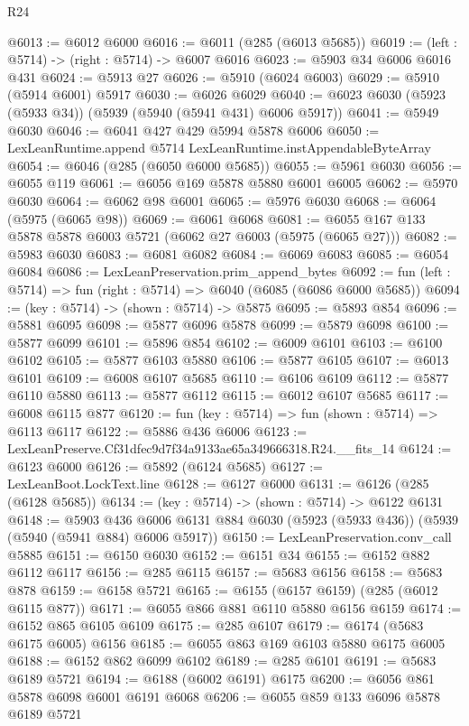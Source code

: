 \begin{lexlean}{R24}
\begin{coremodule}
@6013 := @6012 @6000
@6016 := @6011 (@285 (@6013 @5685))
@6019 := (left : @5714) -> (right : @5714) -> @6007 @6016
@6023 := @5903 @34 @6006 @6016 @431
@6024 := @5913 @27
@6026 := @5910 (@6024 @6003)
@6029 := @5910 (@5914 @6001) @5917
@6030 := @6026 @6029
@6040 := @6023 @6030 (@5923 (@5933 @34)) (@5939 (@5940 (@5941 @431) @6006 @5917))
@6041 := @5949 @6030
@6046 := @6041 @427 @429 @5994 @5878 @6006
@6050 := LexLeanRuntime.append @5714 LexLeanRuntime.instAppendableByteArray
@6054 := @6046 (@285 (@6050 @6000 @5685))
@6055 := @5961 @6030
@6056 := @6055 @119
@6061 := @6056 @169 @5878 @5880 @6001 @6005
@6062 := @5970 @6030
@6064 := @6062 @98 @6001
@6065 := @5976 @6030
@6068 := @6064 (@5975 (@6065 @98))
@6069 := @6061 @6068
@6081 := @6055 @167 @133 @5878 @5878 @6003 @5721 (@6062 @27 @6003 (@5975 (@6065 @27)))
@6082 := @5983 @6030
@6083 := @6081 @6082
@6084 := @6069 @6083
@6085 := @6054 @6084
@6086 := LexLeanPreservation.prim_append_bytes
@6092 := fun (left : @5714) => fun (right : @5714) => @6040 (@6085 (@6086 @6000 @5685))
@6094 := (key : @5714) -> (shown : @5714) -> @5875
@6095 := @5893 @854
@6096 := @5881 @6095
@6098 := @5877 @6096 @5878
@6099 := @5879 @6098
@6100 := @5877 @6099
@6101 := @5896 @854
@6102 := @6009 @6101
@6103 := @6100 @6102
@6105 := @5877 @6103 @5880
@6106 := @5877 @6105
@6107 := @6013 @6101
@6109 := @6008 @6107 @5685
@6110 := @6106 @6109
@6112 := @5877 @6110 @5880
@6113 := @5877 @6112
@6115 := @6012 @6107 @5685
@6117 := @6008 @6115 @877
@6120 := fun (key : @5714) => fun (shown : @5714) => @6113 @6117
@6122 := @5886 @436 @6006
@6123 := LexLeanPreserve.Cf31dfec9d7f34a9133ae65a349666318.R24.__fits_14
@6124 := @6123 @6000
@6126 := @5892 (@6124 @5685)
@6127 := LexLeanBoot.LockText.line
@6128 := @6127 @6000
@6131 := @6126 (@285 (@6128 @5685))
@6134 := (key : @5714) -> (shown : @5714) -> @6122 @6131
@6148 := @5903
    @436
    @6006
    @6131
    @884
    @6030
    (@5923 (@5933 @436))
    (@5939 (@5940 (@5941 @884) @6006 @5917))
@6150 := LexLeanPreservation.conv_call @5885
@6151 := @6150 @6030
@6152 := @6151 @34
@6155 := @6152 @882 @6112 @6117
@6156 := @285 @6115
@6157 := @5683 @6156
@6158 := @5683 @878
@6159 := @6158 @5721
@6165 := @6155 (@6157 @6159) (@285 (@6012 @6115 @877))
@6171 := @6055 @866 @881 @6110 @5880 @6156 @6159
@6174 := @6152 @865 @6105 @6109
@6175 := @285 @6107
@6179 := @6174 (@5683 @6175 @6005) @6156
@6185 := @6055 @863 @169 @6103 @5880 @6175 @6005
@6188 := @6152 @862 @6099 @6102
@6189 := @285 @6101
@6191 := @5683 @6189 @5721
@6194 := @6188 (@6002 @6191) @6175
@6200 := @6056 @861 @5878 @6098 @6001 @6191 @6068
@6206 := @6055 @859 @133 @6096 @5878 @6189 @5721

\end{coremodule}
\end{lexlean}
